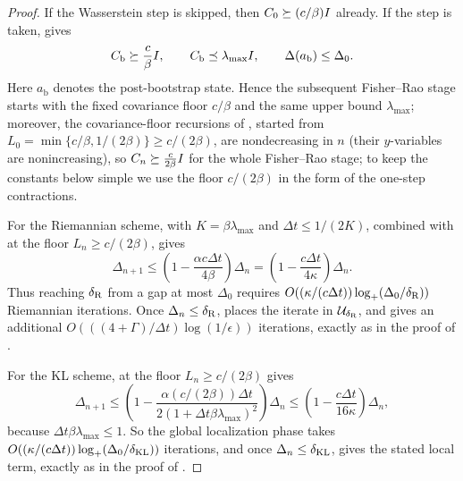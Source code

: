 \begin{proof}
If the Wasserstein step is skipped, then $C_0\succeq(c/\beta)I$ already. If the step is taken,
 gives
\[
    C_{\mathrm b}\succeq\frac c\beta I,
    \qquad
    C_{\mathrm b}\preceq\lambda_{\max}I,
    \qquad
    \Delta(a_{\mathrm b})\le\Delta_0.
\]
Here $a_{\mathrm b}$ denotes the post-bootstrap state. Hence the subsequent Fisher--Rao stage
starts with the fixed covariance floor $c/\beta$ and the same upper bound $\lambda_{\max}$;
moreover, the covariance-floor recursions of , started
from $L_0=\min\{c/\beta,1/(2\beta)\}\geq c/(2\beta)$, are nondecreasing in $n$ (their
$y$-variables are nonincreasing), so $C_n\succeq\tfrac{c}{2\beta}I$ for the whole
Fisher--Rao stage; to keep the constants below simple we use the floor $c/(2\beta)$ in
the form of the one-step contractions.

For the Riemannian scheme,  with
$K=\beta\lambda_{\max}$ and $\Delta t\leq1/(2K)$, combined with
 at the floor $L_n\geq c/(2\beta)$, gives
\[
    \Delta_{n+1}
    \leq
    \left(1-\frac{\alpha c\Delta t}{4\beta}\right)\Delta_n
    =
    \left(1-\frac{c\Delta t}{4\kappa}\right)\Delta_n.
\] Thus reaching $\delta_{\mathrm{R}}$ from a gap at most
$\Delta_0$ requires $O((\kappa/(c\Delta t))\log_+(\Delta_0/\delta_{\mathrm{R}}))$ Riemannian
iterations. Once $\Delta_n\le\delta_{\mathrm{R}}$,  places the iterate in
$\mathcal{U}_{\delta_{\mathrm{R}}}$, and  gives an additional
$O(((4+\Gamma)/\Delta t)\log(1/\epsilon))$ iterations, exactly as in the proof of
.

For the KL scheme,  at the floor
$L_n\geq c/(2\beta)$ gives
\[
    \Delta_{n+1}
    \leq
    \left(
        1-
        \frac{\alpha(c/(2\beta))\Delta t}
             {2(1+\Delta t\beta\lambda_{\max})^2}
    \right)\Delta_n
    \leq
    \left(1-\frac{c\Delta t}{16\kappa}\right)\Delta_n,
\]
because $\Delta t\beta\lambda_{\max}\leq1$. So the
global localization phase takes $O((\kappa/(c\Delta t))\log_+(\Delta_0/\delta_{\mathrm{KL}}))$
iterations, and once $\Delta_n\le\delta_{\mathrm{KL}}$,  gives the stated
local term, exactly as in the proof of .
\end{proof}

